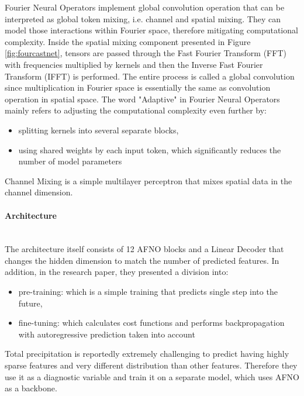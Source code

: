 Fourier Neural Operators implement global convolution operation that can be interpreted as global token mixing, i.e. channel and spatial mixing. They can model those interactions within Fourier space, therefore mitigating computational complexity. Inside the spatial mixing component presented in Figure \ref{fig:fourcastnet}, tensors are passed through the Fast Fourier Transform (FFT) with frequencies multiplied by kernels and then the Inverse Fast Fourier Transform (IFFT) is performed. The entire process is called a global convolution since multiplication in Fourier space is essentially the same as convolution operation in spatial space. The word "Adaptive" in Fourier Neural Operators mainly refers to adjusting the computational complexity even further by:
\begin{itemize}
    \item splitting kernels into several separate blocks,
    \item using shared weights by each input token, which significantly reduces the number of model parameters
\end{itemize}

Channel Mixing is a simple multilayer perceptron that mixes spatial data in the channel dimension.

\paragraph{Architecture} \mbox{} \\
\noindent The architecture itself consists of 12 AFNO blocks and a Linear Decoder that changes the hidden dimension to match the number of predicted features. In addition, in the research paper, they presented a division into:
\begin{itemize}
    \item pre-training: which is a simple training that predicts single step into the future,
    \item fine-tuning: which calculates cost functions and performs backpropagation with autoregressive prediction taken into account
\end{itemize}

Total precipitation is reportedly extremely challenging to predict having highly sparse features and very different distribution than other features. Therefore they use it as a diagnostic variable and train it on a separate model, which uses AFNO as a backbone.

